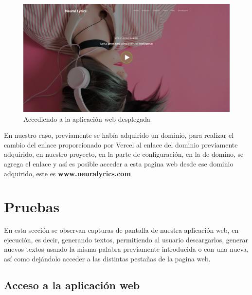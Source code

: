 \documentclass[12pt, a4paper, titlepage]{report}
\begin{document}
\begin{figure}[H]
	\includegraphics[width=12cm]{./imagenes/Desarrollo/Despliegue/Paginaweb.png}
	\centering 
	\caption{Accediendo a la aplicación web desplegada}
\end{figure}
En nuestro caso, previamente se había adquirido un dominio, para realizar el cambio del enlace proporcionado por Vercel al enlace del dominio previamente adquirido, en nuestro proyecto, en la parte de configuración, en la de domino, se agrega el enlace y así es posible acceder a esta pagina web desde ese dominio adquirido, este es  \textbf{www.neuralyrics.com}

\section{Pruebas}

En esta sección se observan capturas de pantalla de nuestra aplicación web, en ejecución, es decir, generando textos, permitiendo al usuario descargarlos, generar nuevos textos usando la misma palabra previamente introducida o con una nueva, así como dejándolo acceder a las distintas pestañas de la pagina web.

\subsection{Acceso a la aplicación web}
\end{document}
